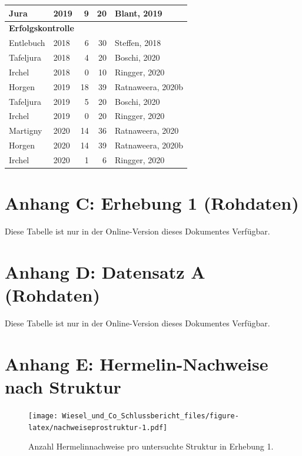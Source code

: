 \documentclass[
  oneside]{scrbook}
\begin{document}
\begin{table}[H]
\begin{tabular}[t]{l|l|r|r|l}
\hline
\hspace{1em}Jura & 2019 & 9 & 20 & Blant, 2019\\
\hline
\multicolumn{5}{l}{\textbf{Erfolgskontrolle}}\\
\hline
\hspace{1em}Entlebuch & 2018 & 6 & 30 & Steffen, 2018\\
\hline
\hspace{1em}Tafeljura & 2018 & 4 & 20 & Boschi, 2020\\
\hline
\hspace{1em}Irchel & 2018 & 0 & 10 & Ringger, 2020\\
\hline
\hspace{1em}Horgen & 2019 & 18 & 39 & Ratnaweera, 2020b\\
\hline
\hspace{1em}Tafeljura & 2019 & 5 & 20 & Boschi, 2020\\
\hline
\hspace{1em}Irchel & 2019 & 0 & 20 & Ringger, 2020\\
\hline
\hspace{1em}Martigny & 2020 & 14 & 36 & Ratnaweera, 2020\\
\hline
\hspace{1em}Horgen & 2020 & 14 & 39 & Ratnaweera, 2020b\\
\hline
\hspace{1em}Irchel & 2020 & 1 & 6 & Ringger, 2020\\
\hline
\end{tabular}
\end{table}

\hypertarget{anhang-c-erhebung-1-rohdaten}{%
\section{Anhang C: Erhebung 1 (Rohdaten)}\label{anhang-c-erhebung-1-rohdaten}}

Diese Tabelle ist nur in der Online-Version dieses Dokumentes Verfügbar.

\hypertarget{anhang-d-datensatz-a-rohdaten}{%
\section{Anhang D: Datensatz A (Rohdaten)}\label{anhang-d-datensatz-a-rohdaten}}

Diese Tabelle ist nur in der Online-Version dieses Dokumentes Verfügbar.

\hypertarget{anhang-e-hermelin-nachweise-nach-struktur}{%
\section{Anhang E: Hermelin-Nachweise nach Struktur}\label{anhang-e-hermelin-nachweise-nach-struktur}}



\begin{figure}
\centering
\texttt{[image: Wiesel\_und\_Co\_Schlussbericht\_files/figure-latex/nachweiseprostruktur-1.pdf]}
\caption{\label{fig:nachweiseprostruktur}Anzahl Hermelinnachweise pro untersuchte Struktur in Erhebung 1.}
\end{figure}
\end{document}
